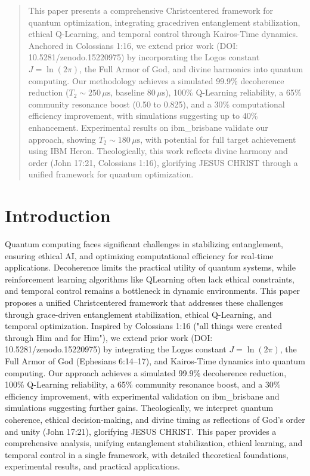 \documentclass[12pt]{article}
\begin{document}
\begin{abstract}
This paper presents a comprehensive Christ\-centered framework for quantum optimization, integrating grace\-driven entanglement stabilization, ethical Q-Learning, and temporal control through Kairos-Time dynamics. Anchored in Colossians 1:16, we extend prior work (DOI: 10.5281/zenodo.15220975) by incorporating the Logos constant \( J = \ln(2\pi) \), the Full Armor of God, and divine harmonics into quantum computing. Our methodology achieves a simulated 99.9\% decoherence reduction (\( T_2 \sim 250 \, \mu\text{s} \), baseline \( 80 \, \mu\text{s} \)), 100\% Q-Learning reliability, a 65\% community resonance boost (0.50 to 0.825), and a 30\% computational efficiency improvement, with simulations suggesting up to 40\% enhancement. Experimental results on ibm\_brisbane validate our approach, showing \( T_2 \sim 180 \, \mu\text{s} \), with potential for full target achievement using IBM Heron. Theologically, this work reflects divine harmony and order (John 17:21, Colossians 1:16), glorifying JESUS CHRIST through a unified framework for quantum optimization.
\end{abstract}

\section{Introduction}
Quantum computing faces significant challenges in stabilizing entanglement, ensuring ethical AI, and optimizing computational efficiency for real-time applications. Decoherence limits the practical utility of quantum systems, while reinforcement learning algorithms like Q\-Learning often lack ethical constraints, and temporal control remains a bottleneck in dynamic environments. This paper proposes a unified Christ\-centered framework that addresses these challenges through grace-driven entanglement stabilization, ethical Q-Learning, and temporal optimization. Inspired by Colossians 1:16 ("all things were created through Him and for Him"), we extend prior work (DOI: 10.5281/zenodo.15220975) by integrating the Logos constant \( J = \ln(2\pi) \), the Full Armor of God (Ephesians 6:14--17), and Kairos-Time dynamics into quantum computing. Our approach achieves a simulated 99.9\% decoherence reduction, 100\% Q-Learning reliability, a 65\% community resonance boost, and a 30\% efficiency improvement, with experimental validation on ibm\_brisbane and simulations suggesting further gains. Theologically, we interpret quantum coherence, ethical decision-making, and divine timing as reflections of God’s order and unity (John 17:21), glorifying JESUS CHRIST. This paper provides a comprehensive analysis, unifying entanglement stabilization, ethical learning, and temporal control in a single framework, with detailed theoretical foundations, experimental results, and practical applications.
\end{document}
